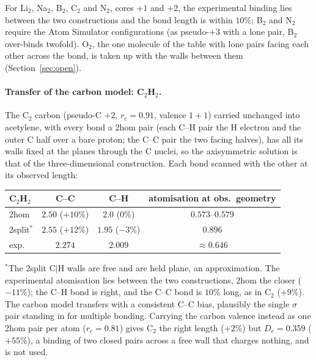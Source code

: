 \documentclass[11pt]{article}
\begin{document}
For Li$_2$, Na$_2$, B$_2$, C$_2$ and N$_2$, cores $+1$ and $+2$, the experimental binding lies between
the two constructions and the bond length is within $10\%$; B$_2$ and N$_2$ require the Atom
Simulator configurations (as pseudo-$+3$ with a lone pair, B$_2$ over-binds twofold). O$_2$, the one
molecule of the table with lone pairs facing each other across the bond, is taken up with the walls
between them (Section~\ref{sec:open}).

\paragraph{Transfer of the carbon model: C$_2$H$_2$.} The C$_2$ carbon (pseudo-C $+2$, $r_c = 0.91$,
valence $1{+}1$) carried unchanged into acetylene, with every bond a 2hom pair (each C--H pair the H
electron and the outer C half over a bare proton; the C--C pair the two facing halves), has all its
walls fixed at the planes through the C nuclei, so the axisymmetric solution is that of the
three-dimensional construction. Each bond scanned with the other at its observed length:
\begin{center}
\small
\begin{tabular}{lccc}
\toprule
C$_2$H$_2$ & C--C & C--H & atomisation at obs.\ geometry \\
\midrule
2hom   & $2.50$ ($+10\%$) & $2.0$ ($0\%$)  & $0.573$--$0.579$ \\
2split$^{*}$ & $2.55$ ($+12\%$) & $1.95$ ($-3\%$) & $0.896$ \\
exp.   & $2.274$ & $2.009$ & $\approx 0.646$ \\
\bottomrule
\end{tabular}
\end{center}
$^{*}$The 2split C$|$H walls are free and are held plane, an approximation. The experimental
atomisation lies between the two constructions, 2hom the closer ($-11\%$); the C--H bond is right,
and the C--C bond is $10\%$ long, as in C$_2$ ($+9\%$). The carbon model transfers with a consistent
C--C bias, plausibly the single $\sigma$ pair standing in for multiple bonding. Carrying the carbon
valence instead as one 2hom pair per atom ($r_c = 0.81$) gives C$_2$ the right length ($+2\%$) but
$D_e = 0.359$ ($+55\%$), a binding of two closed pairs across a free wall that charges nothing, and is
not used.
\end{document}
